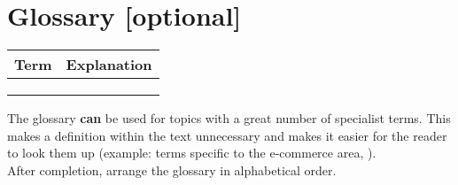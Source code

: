 \chapter{Glossary [optional]}
\label{sec: Glossary}

\begin{table}[h]
	\centering
	\begin{tabular}{|p{3cm}|p{11.6cm}|}
		\hline
		\rowcolor{lightgray}\textbf{Term} & \textbf{Explanation} \\
		\hline
		 & \\ 
		\hline
		 & \\ 
		\hline
		 & \\ 
		\hline
	\end{tabular}
\end{table}

\noindent The glossary \textbf{can} be used for topics with a great number of specialist terms. This makes a definition within the text unnecessary and makes it easier for the reader to look them up (example: terms specific to the e-commerce area, \etc).
\vspace{6pt}\\
After completion, arrange the glossary in alphabetical order.
